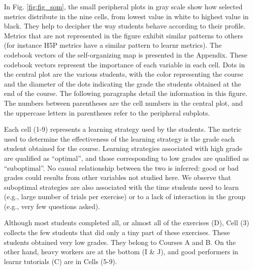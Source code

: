 \documentclass{aims} %
\theoremstyle{definition}
\begin{document}
In Fig. \ref {fig:fig_som}, the small peripheral plots in gray scale
show how selected metrics distribute in the nine cells, from lowest
value in white to highest value in black. They help to decipher the way
students behave according to their profile. Metrics that are not
represented in the figure exhibit similar patterns to others (for
instance H5P metrics have a similar pattern to learnr metrics). The
codebook vectors of the self-organizing map is presented in the
Appendix. These codebook vectors represent the importance of each
variable in each cell. Dots in the central plot are the various
students, with the color representing the course and the diameter of the
dots indicating the grade the students obtained at the end of the
course. The following paragraphs detail the information in this figure.
The numbers between parentheses are the cell numbers in the central
plot, and the uppercase letters in parentheses refer to the peripheral
subplots.

Each cell (1-9) represents a learning strategy used by the students. The
metric used to determine the effectiveness of the learning strategy is
the grade each student obtained for the course. Learning strategies
associated with high grade are qualified as ``optimal'', and those
corresponding to low grades are qualified as ``suboptimal''. No causal
relationship between the two is inferred: good or bad grades could
results from other variables not studied here. We observe that
suboptimal strategies are also associated with the time students need to
learn (e.g., large number of trials per exercise) or to a lack of
interaction in the group (e.g., very few questions asked).

Although most students completed all, or almost all of the exercises
(D), Cell (3) collects the few students that did only a tiny part of
these exercises. These students obtained very low grades. They belong to
Courses A and B. On the other hand, heavy workers are at the bottom (I
\& J), and good performers in learnr tutorials (C) are in Cells (5-9).
\end{document}

